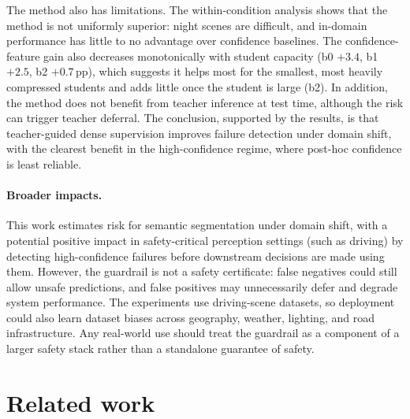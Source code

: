 \documentclass{article}
\begin{document}
The method also has limitations. The within-condition analysis shows that the method is not uniformly superior: night scenes are difficult, and in-domain performance has little to no advantage over confidence baselines. The confidence-feature gain also decreases monotonically with student capacity (b0 $+3.4$, b1 $+2.5$, b2 $+0.7$\,pp), which suggests it helps most for the smallest, most heavily compressed students and adds little once the student is large (b2). In addition, the method does not benefit from teacher inference at test time, although the risk can trigger teacher deferral. The conclusion, supported by the results, is that teacher-guided dense supervision improves failure detection under domain shift, with the clearest benefit in the high-confidence regime, where post-hoc confidence is least reliable.






\paragraph{Broader impacts.}
This work estimates risk for semantic segmentation under domain shift, with a potential positive impact in safety-critical perception settings (such as driving) by detecting high-confidence failures before downstream decisions are made using them. However, the guardrail is not a safety certificate: false negatives could still allow unsafe predictions, and false positives may unnecessarily defer and degrade system performance. The experiments use driving-scene datasets, so deployment could also learn dataset biases across geography, weather, lighting, and road infrastructure. Any real-world use should treat the guardrail as a component of a larger safety stack rather than a standalone guarantee of safety.


\section{Related work}
\end{document}
